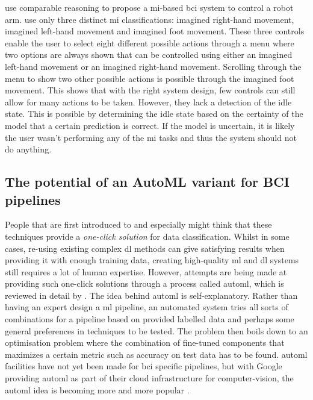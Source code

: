  use comparable reasoning to propose a \gls{mi}-based \gls{bci} system to control a robot arm.
 use only three distinct \gls{mi} classifications: imagined right-hand movement, imagined left-hand movement and imagined foot movement.
These three controls enable the user to select eight different possible actions through a menu where two options are always shown that can be controlled using either an imagined left-hand movement or an imagined right-hand movement.
Scrolling through the menu to show two other possible actions is possible through the imagined foot movement.
This shows that with the right system design, few controls can still allow for many actions to be taken.
However, they lack a detection of the idle state.
This is possible by determining the idle state based on the certainty of the model that a certain prediction is correct.
If the model is uncertain, it is likely the user wasn't performing any of the \gls{mi} tasks and thus the system should not do anything.



\subsection{The potential of an AutoML variant for BCI pipelines}
\label{subsec:bci_opportunities_obstacles_automl}

People that are first introduced to  and especially  might think that these techniques provide a \textit{one-click solution} for data classification.
Whilst in some cases, re-using existing complex \gls{dl} methods can give satisfying results when providing it with enough training data, creating high-quality \gls{ml} and \gls{dl} systems still requires a lot of human expertise.
However, attempts are being made at providing such one-click solutions through a process called \gls{automl}, which is reviewed in detail by \citet{automl}.
The idea behind \gls{automl} is self-explanatory.
Rather than having an expert design a \gls{ml} pipeline, an automated system tries all sorts of combinations for a pipeline based on provided labelled data and perhaps some general preferences in techniques to be tested.
The problem then boils down to an optimisation problem where the combination of fine-tuned components that maximizes a certain metric such as accuracy on test data has to be found.
\Gls{automl} facilities have not yet been made for \gls{bci} specific pipelines, but with Google providing \gls{automl} as part of their cloud infrastructure for computer-vision, the \gls{automl} idea is becoming more and more popular \citep{bci_review_arnau}.

